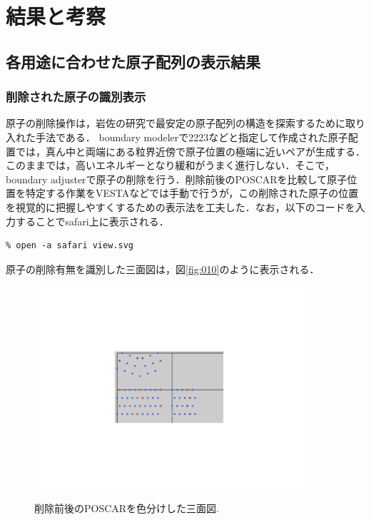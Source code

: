 
\section{結果と考察}
\subsection{各用途に合わせた原子配列の表示結果}
\subsubsection{削除された原子の識別表示}
原子の削除操作は，岩佐の研究で最安定の原子配列の構造を探索するために取り入れた手法である．
boundary modelerで2223などと指定して作成された原子配置では，真ん中と両端にある粒界近傍で原子位置の極端に近いペアが生成する．このままでは，高いエネルギーとなり緩和がうまく進行しない．そこで，boundary adjusterで原子の削除を行う．削除前後のPOSCARを比較して原子位置を特定する作業をVESTAなどでは手動で行うが，この削除された原子の位置を視覚的に把握しやすくするための表示法を工夫した．なお，以下のコードを入力することでsafari上に表示される．
\begin{lstlisting}[style=customCsh,basicstyle={\scriptsize\ttfamily}]
% ruby viewer.rb POSCAR_2223 POSCAR_2223_4
% open -a safari view.svg 
\end{lstlisting}
原子の削除有無を識別した三面図は，図\ref{fig:010}のように表示される．

\begin{figure}[htbp]\begin{center}
\includegraphics[width=10cm,bb= 0 0 937 753]{../figs/./boundary_narita.010.jpeg}
\caption{削除前後のPOSCARを色分けした三面図.}
\label{fig:010}
\label{default}\end{center}\end{figure}

